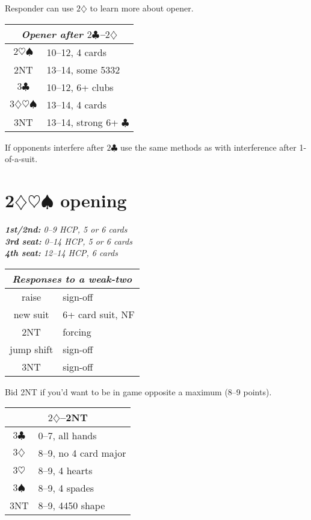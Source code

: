 \documentclass[a4paper, twoside, 11pt]{article}
\begin{document}
\begin{multicols}{3}
Responder can use $2\diamondsuit$ to learn more about opener.
\begin{center}
\begin{tabular}{ |c|l| }
 \hline
 \multicolumn{2}{|c|}{\textit{Opener after $2\clubsuit$--$2\diamondsuit$}} \\
 \hline
 $2\heartsuit\spadesuit$ & 10--12, 4 cards\\
 \textnormal{2NT} &  13--14, some 5332 \\
$3\clubsuit$ & 10--12, 6+ clubs\\
 $3\diamondsuit\heartsuit\spadesuit$ & 13--14, 4 cards \\
 \textnormal{3NT} & 13--14, strong 6+ $\clubsuit$ \\
 \hline
\end{tabular}
\end{center}

If opponents interfere after $2\clubsuit$ use the same methods as with interference after 1-of-a-suit.

\section{2$\diamondsuit\heartsuit\spadesuit$ opening}

\emph{\textbf{1st/2nd:} 0--9 HCP, 5 or 6 cards \\ \textbf{3rd seat:} 0--14 HCP, 5 or 6 cards \\ \textbf{4th seat:} 12--14 HCP, 6 cards}

\begin{center}
\begin{tabular}{ |c|l| }
 \hline
 \multicolumn{2}{|c|}{\textit{Responses to a weak-two}} \\
 \hline
 raise & sign-off\\
 new suit & 6+ card suit, NF  \\
\textnormal{2NT} & forcing \\
 jump shift & sign-off \\
 \textnormal{3NT} & sign-off \\
 \hline
\end{tabular}
\end{center}

Bid \textnormal{2NT} if you'd want to be in game opposite a maximum (8--9 points).
\begin{center}
\begin{tabular}{ |c|l| }
 \hline
 \multicolumn{2}{|c|}{$2\diamondsuit$--\textnormal{2NT}} \\
 \hline
$3\clubsuit$ & 0--7, all hands\\
$3\diamondsuit$ & 8--9, no 4 card major \\
$3\heartsuit$ & 8--9, 4 hearts \\
$3\spadesuit$ & 8--9, 4 spades \\
 \textnormal{3NT} & 8--9, 4450 shape \\
 \hline
\end{tabular}
\end{center}


\end{multicols}
\end{document}
